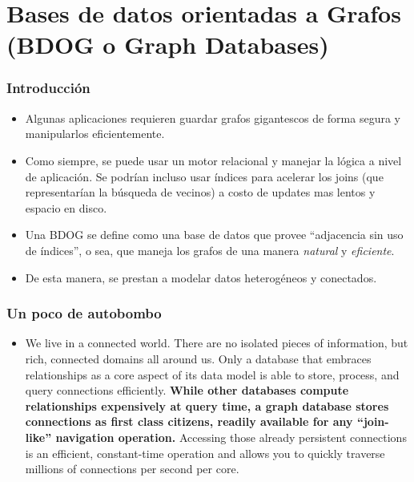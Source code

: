 \section{Bases de datos orientadas a Grafos (BDOG o Graph Databases)}

\begin{frame}
\frametitle{Introducción}
\begin{itemize}

\item	Algunas aplicaciones requieren guardar grafos gigantescos de
	forma segura y manipularlos eficientemente.
	\pause

\item	Como siempre, se puede usar un motor relacional y manejar
	la lógica a nivel de aplicación. Se podrían incluso usar índices
	para acelerar los joins (que representarían la búsqueda de vecinos)
	a costo de updates mas lentos y espacio en disco.
	\pause

\item	Una BDOG se define como una base de datos que provee ``adjacencia
	sin uso de índices'', o sea, que maneja los grafos de una manera
	\textit{natural} y \textit{eficiente}.
	\pause

\item	De esta manera, se prestan a modelar datos heterogéneos y
	conectados.
\end{itemize}
\end{frame}

\begin{frame}
\frametitle{Un poco de autobombo}
\begin{itemize}
\item	We live in a connected world. There are no isolated pieces of
	information, but rich, connected domains all around us. Only a database
	that embraces relationships as a core aspect of its data model is able
	to store, process, and query connections efficiently. \textbf{While other
	databases compute relationships expensively at query time, a graph
	database stores connections as first class citizens, readily available
	for any “join-like” navigation operation.} Accessing those already
	persistent connections is an efficient, constant-time operation and
	allows you to quickly traverse millions of connections per second per
	core.
\end{itemize}
\end{frame}

